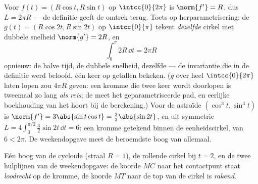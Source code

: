 \begin{example}\label{ex:b1:curves:circlelength}
Voor $f(t) = (R\cos t, R\sin t)$ op $\intcc{0}{2\pi}$ is
$\norm{f'} = R$, dus $L = 2\pi R$ --- de definitie geeft de omtrek
terug. Toets op herparametrisering: de  $g(t) = (R\cos
2t, R\sin 2t)$ op $\intcc{0}{\pi}$ tekent \emph{dezelfde} cirkel
met dubbele snelheid $\norm{g'} = 2R$, en
\[
\int_0^{\pi} 2R\,\dd t = 2\pi R
\]
opnieuw: de halve tijd, de dubbele snelheid, dezelfde  ---
de invariantie die in de definitie werd beloofd, één keer op
getallen bekeken. ($g$ over heel $\intcc{0}{2\pi}$ laten lopen zou
$4\pi R$ geven: een kromme die twee keer wordt doorlopen is
tweemaal zo lang \emph{als reis}; de  meet het
geparametriseerde pad, en eerlijke boekhouding van het 
hoort bij de berekening.) Voor de astroïde $(\cos^3t, \sin^3t)$ is
$\norm{f'} = 3\abs{\sin t\cos t} = \tfrac32\abs{\sin 2t}$, en uit
symmetrie $L = 4\int_0^{\pi/2} \tfrac32\sin 2t\,\dd t = 6$: een
kromme getekend binnen de eenheidscirkel, van  $6 < 2\pi$.
De weekendopgave meet de beroemdste boog van allemaal.
\end{example}

\begin{omfigure}

{\small Eén boog van de cycloïde (straal $R = 1$), de rollende
cirkel bij $t = 2$, en de twee hulplijnen van de weekendopgave: de
koorde $MC$ naar het contactpunt staat \emph{loodrecht} op de
kromme, de koorde $MT$ naar de top van de cirkel is
\emph{rakend}.}
\end{omfigure}

